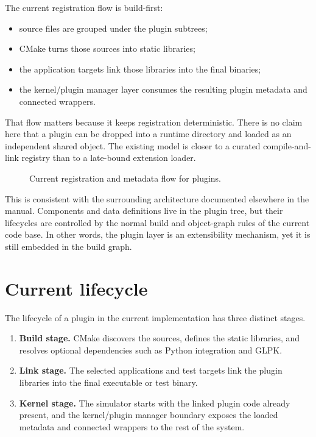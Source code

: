 The current registration flow is build-first:
\begin{itemize}
 \item source files are grouped under the plugin subtrees;
 \item CMake turns those sources into static libraries;
 \item the application targets link those libraries into the final binaries;
 \item the kernel/plugin manager layer consumes the resulting plugin
   metadata and connected wrappers.
\end{itemize}

That flow matters because it keeps registration deterministic. There is no
claim here that a plugin can be dropped into a runtime directory and loaded as
an independent shared object. The existing model is closer to a curated
compile-and-link registry than to a late-bound extension loader.

\begin{figure}[htbp]
\caption{Current registration and metadata flow for plugins.}
\label{fig:plugin-registration-flow}
\end{figure}

This is consistent with the surrounding architecture documented elsewhere in
the manual. Components and data definitions live in the plugin tree, but their
lifecycles are controlled by the normal build and object-graph rules of the
current code base. In other words, the plugin layer is an extensibility
mechanism, yet it is still embedded in the build graph.

\section{Current lifecycle}
\label{sec:plugin-current-lifecycle}

The lifecycle of a plugin in the current implementation has three distinct
stages.

\begin{enumerate}
 \item \textbf{Build stage.} CMake discovers the sources, defines the static
   libraries, and resolves optional dependencies such as Python integration and
   GLPK.
 \item \textbf{Link stage.} The selected applications and test targets link
   the plugin libraries into the final executable or test binary.
 \item \textbf{Kernel stage.} The simulator starts with the linked plugin code
   already present, and the kernel/plugin manager boundary exposes the loaded
   metadata and connected wrappers to the rest of the system.
\end{enumerate}

